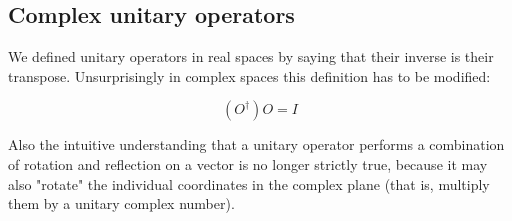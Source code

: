 \subsection{Complex unitary operators}

We defined unitary operators in real spaces by saying that their inverse is their transpose. Unsurprisingly in complex spaces this definition has to be modified:

$$(O^\dagger) O = I$$

Also the intuitive understanding that a unitary operator performs a combination of rotation and reflection on a vector is no longer strictly true, because it may also "rotate" the individual coordinates in the complex plane (that is, multiply them by a unitary complex number).